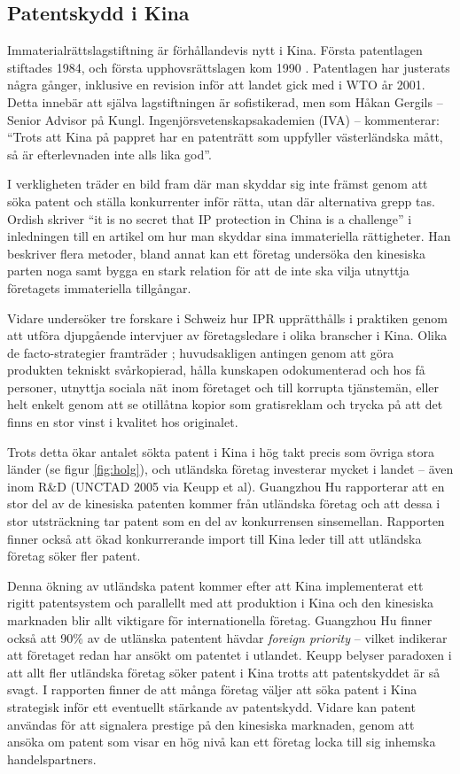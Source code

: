 
\subsection{Patentskydd i Kina}

Immaterialrättslagstiftning är förhållandevis nytt i Kina. Första patentlagen stiftades 1984, och första upphovsrättslagen kom 1990 \cite{gergils}. Patentlagen har justerats några gånger, inklusive en revision inför att landet gick med i WTO år 2001. Detta innebär att själva lagstiftningen är sofistikerad, men som Håkan Gergils -- Senior Advisor på Kungl. Ingenjörsvetenskapsakademien (IVA) -- kommenterar: ``Trots att Kina på pappret har en patenträtt som uppfyller västerländska mått, så är 
efterlevnaden inte alls lika god''.

I verkligheten träder en bild fram där man skyddar sig inte främst genom att söka patent och ställa konkurrenter inför rätta, utan där alternativa grepp tas. Ordish skriver ``it is no secret that IP protection in China is a challenge'' \cite{ordish} i inledningen till en artikel om hur man skyddar sina immateriella rättigheter. Han beskriver flera metoder, bland annat kan ett företag undersöka den kinesiska parten noga samt bygga en stark relation för att de inte ska vilja utnyttja företagets immateriella tillgångar.

Vidare undersöker tre forskare i Schweiz hur IPR upprätthålls i praktiken genom att utföra djupgående intervjuer av företagsledare i olika branscher i Kina. Olika de facto-strategier framträder \cite{keupp}; huvudsakligen antingen genom att göra produkten tekniskt svårkopierad, hålla kunskapen odokumenterad och hos få personer, utnyttja sociala nät inom företaget och till korrupta tjänstemän, eller helt enkelt genom att se otillåtna kopior som gratisreklam och trycka på att det finns en stor vinst i kvalitet hos originalet.

Trots detta ökar antalet sökta patent i Kina i hög takt precis som övriga stora länder (se figur \ref{fig:holg}), och utländska företag investerar mycket i landet -- även inom R\&D (UNCTAD 2005 via Keupp et al). Guangzhou Hu rapporterar att en stor del av de kinesiska patenten kommer från utländska företag och att dessa i stor utsträckning tar patent som en del av konkurrensen sinsemellan\cite{hu}. Rapporten finner också att ökad konkurrerande import till Kina leder till att utländska företag söker fler patent.

Denna ökning av utländska patent kommer efter att Kina implementerat ett rigitt patentsystem och parallellt med att produktion i Kina och den kinesiska marknaden blir allt viktigare för internationella företag. Guangzhou Hu finner också att 90\% av de utlänska patentent hävdar \emph{foreign priority} -- vilket indikerar att företaget redan har ansökt om patentet i utlandet\cite{hu}. Keupp belyser paradoxen i att allt fler utländska företag söker patent i Kina trotts att patentskyddet är så svagt\cite{keupp2}. I rapporten finner de att många företag väljer att söka patent i Kina strategisk inför ett eventuellt stärkande av patentskydd\cite{keupp2}. Vidare kan patent användas för att signalera prestige på den kinesiska marknaden, genom att ansöka om patent som visar en hög nivå kan ett företag locka till sig inhemska handelspartners\cite{keupp2}.
